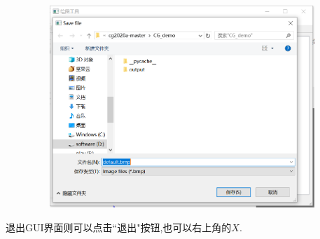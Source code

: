 \documentclass[a4paper,UTF8]{article}
\theoremstyle{definition}
\begin{document}
\begin{figure}[H]
	\includegraphics[width=5in,height=3in]{save.png}
\end{figure}
退出GUI界面则可以点击``退出"按钮,也可以右上角的$X$.
\end{document}
